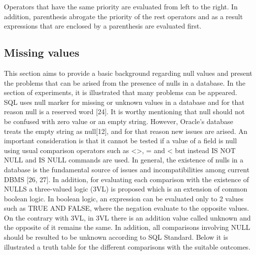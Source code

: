 Operators that have the same priority are evaluated from left to the right. In addition, parenthesis abrogate the priority of the rest operators and as a result expressions that are enclosed by a parenthesis are evaluated first.    
 
\subsection{Missing values} 
This section aims to provide a basic background regarding null values and present the problems that can be arised from the presence of nulls in a database. In the section of experiments, it is illustrated that many problems can be appeared. SQL uses null marker for missing or unknown values in a database and for that reason null is a reserved word [24]. It is worthy mentioning that null should not be confused with zero value or an empty string. However, Oracle’s database treats the empty string as null[12], and for that reason new issues are arised.  An important consideration is that it cannot be tested if a value of a field is null using usual comparison operators such as  <>, =  and <  but instead IS NOT NULL and IS NULL commands are used. In general, the existence of nulls in a database is the fundamental source of issues and incompatibilities among current DBMS [26, 27]. In addition, for evaluating each comparison with the existence of NULLS a three-valued logic (3VL) is proposed which is an extension of common boolean logic. In boolean logic, an expression can be evaluated only to 2 values such as TRUE AND FALSE, where the negation evaluate to the opposite values. On the contrary with 3VL, in 3VL there is an addition value called unknown and the opposite of it remains the same. In addition, all comparisons involving NULL should be resulted to be unknown according to SQL Standard. Below it is illustrated a truth table for the different comparisons with the suitable outcomes.

